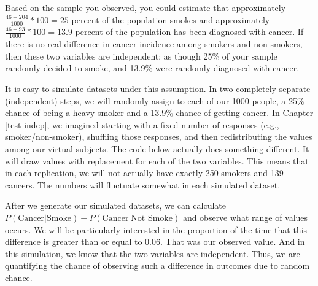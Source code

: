 \documentclass[
  openany]{book}
\begin{document}
Based on the sample you observed, you could estimate that approximately \(\frac{46+204}{1000}*100=25\) percent of the population smokes and approximately \(\frac{46+93}{1000}*100=13.9\) percent of the population has been diagnosed with cancer. If there is no real difference in cancer incidence among smokers and non-smokers, then these two variables are independent: as though 25\% of your sample randomly decided to smoke, and 13.9\% were randomly diagnosed with cancer.

It is easy to simulate datasets under this assumption. In two completely separate (independent) steps, we will randomly assign to each of our 1000 people, a 25\% chance of being a heavy smoker and a 13.9\% chance of getting cancer. In Chapter \ref{test-indep}, we imagined starting with a fixed number of responses (e.g., smoker/non-smoker), shuffling those responses, and then redistributing the values among our virtual subjects. The code below actually does something different. It will draw values with replacement for each of the two variables. This means that in each replication, we will not actually have exactly 250 smokers and 139 cancers. The numbers will fluctuate somewhat in each simulated dataset.

After we generate our simulated datasets, we can calculate \(P(\text{Cancer}|\text{Smoke})-P(\text{Cancer}|\text{Not Smoke})\) and observe what range of values occurs. We will be particularly interested in the proportion of the time that this difference is greater than or equal to \(0.06\). That was our observed value. And in this simulation, we know that the two variables are independent. Thus, we are quantifying the chance of observing such a difference in outcomes due to random chance.
\end{document}
